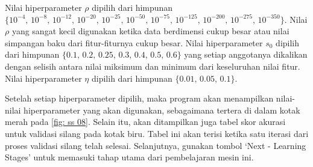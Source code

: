 \noindent Nilai hiperparameter $\rho$ dipilih dari himpunan $\{ 10^{-4}\text{, } \allowbreak 10^{-8} \text{, } \allowbreak 10^{-12} \text{, } \allowbreak 10^{-20} \text{, } \allowbreak 10^{-25} \text{, } \allowbreak 10^{-50} \text{, } \allowbreak 10^{-75} \text{, } \allowbreak 10^{-125} \text{, } \allowbreak 10^{-200} \text{, } \allowbreak 10^{-275} \text{, } \allowbreak 10^{-350} \}$. Nilai $\rho$ yang sangat kecil digunakan ketika data berdimensi cukup besar atau nilai simpangan baku dari fitur-fiturnya cukup besar. Nilai hiperparameter $s_0$ dipilih dari himpunan $\{\num{0,1} \text{, } \allowbreak \num{0,2} \text{, } \allowbreak \num{0,25} \text{, } \allowbreak \num{0,3} \text{, } \allowbreak \num{0,4} \text{, } \num{0,5} \text{, } \allowbreak \num{0,6}\}$ yang setiap anggotanya dikalikan dengan selisih antara nilai miksimum dan minimum dari keseluruhan nilai fitur. Nilai hiperparameter $\eta$ dipilih dari himpunan $\{\num{0,01} \text{, } \allowbreak \num{0,05} \text{, } \allowbreak \num{0,1}\}$.

\noindent Setelah setiap hiperparameter dipilih, maka program akan menampilkan nilai-nilai hiperparameter yang akan digunakan, sebagaimana tertera di dalam kotak merah pada \ref{fig: ss 08}. Selain itu, akan ditampilkan juga tabel skor akurasi untuk validasi silang pada kotak biru. Tabel ini akan terisi ketika satu iterasi dari proses validasi silang telah selesai. Selanjutnya, gunakan tombol `\colorbox{gray!30}{Next - Learning Stages}' untuk memasuki tahap utama dari pembelajaran mesin ini.

